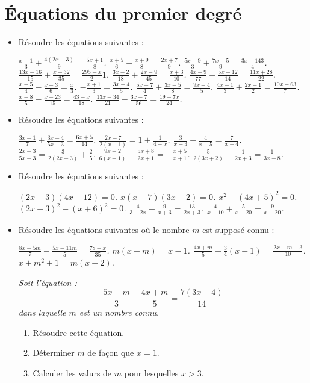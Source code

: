 \section*{Équations du premier degré}
\begin{itemize}
\item Résoudre les équations suivantes : 
\begin{itemize}
\it $\frac{x-1}3+\frac{4(2x-3)}9 = \frac{5x+1}8$.
\it $\frac{x+5}6 + \frac{x+9}8 = \frac{2x+7}9$.
\it $\frac{5x-9}3 + \frac{7x-5}9 = \frac{3x-143}4$.
\it $\frac{13x-16}{15}+\frac{x-32}{35} = \frac{295-x}21$.
\it $\frac{3x-2}{18}+\frac{2x-9}{45}=\frac{x+3}{10}$.
\it $\frac{4x+9}{77}-\frac{5x+12}{14}=\frac{11x+28}{22}$.
\it $\frac{x+5}4 -\frac{x-3}6 = \frac{x}3$.
\it $-\frac{x+1}3 = \frac{3x+4}5$.
\it $\frac{5x-7}4 + \frac{3x-5}8 = \frac{9x-4}5$.
\it $\frac{4x-1}3+\frac{2x-1}2=\frac{10x+63}7$.
\it $\frac{x-8}5-\frac{x-23}{15} = \frac{43-x}{18} $.
\it $\frac{13x-34}{21} - \frac{3x-7}{56} = \frac{19-7x}{24}$. 
\end{itemize}
\item Résoudre les équations suivantes : 
\begin{itemize}
\it $\frac{3x-1}7 + \frac{3x-4}{5x-3} = \frac{6x+5}{14}$. 
\it $\frac{2x-7}{2(x-1)} = 1+ \frac1{4-x}$.
\it $\frac3{x-3} + \frac4{x-5} = \frac7{x-4}$.
\it $\frac{2x+3}{5x-3} = \frac{3}{2(2x-3)} + \frac25$.
\it $\frac{9x+2}{6(x+1)} - \frac{5x+8}{2x+1} = - \frac{x+5}{x+1}$. 
\it $\frac5{2(3x+2)} - \frac1{2x+3} = \frac1{3x-8}$. 
\end{itemize}
\item Résoudre les équations suivantes : 
\begin{itemize}
\it $(2x-3)(4x-12)=0$.
\it $x(x-7)(3x-2) = 0$.
\it $x^2-(4x+5)^2 = 0$. 
\it $(2x-3)^2- (x+6)^2=0$.
\it $\frac4{3-2x}+\frac9{x+3} = \frac{13}{2x+3}$.
\it $\frac4{x+10}+\frac5{x-20} = \frac9{x+20}$.  
\end{itemize}
\item Résoudre les équations suivantes où le nombre $m$ est supposé connu : 
\begin{itemize}
\it $\frac{8x-5m}7 - \frac{5x-11m}5 = \frac{78 - x}{35}$. 
\it $m(x-m)=x-1$.
\it $\frac{4x+m}5 - \frac34(x-1) = \frac{2x-m+3}{10}$.
\it $x+m^2+1=m(x+2)$.
\end{itemize}
\it Soit l'équation : \[ \frac{5x-m}3 - \frac{4x+m}5
= \frac{7(3x+4)}{14}\]
dans laquelle $m$ est un nombre connu.
\begin{enumerate}
\item Résoudre cette équation.
\item Déterminer $m$ de façon que $x=1$.
\item Calculer les valurs de $m$ pour lesquelles $x>3$.
\end{enumerate}
\end{itemize}

